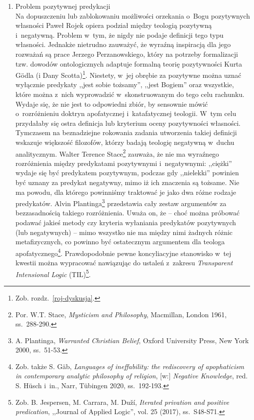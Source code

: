 \begin{enumerate}[label = \arabic*), itemindent=6mm, labelwidth=4mm, labelsep=2mm, itemsep=1em, leftmargin=0mm]
\item Problem pozytywnej predykacji\\
Na dopuszczeniu lub zablokowaniu możliwości orzekania o~Bogu pozytywnych własności Paweł Rojek opiera podział między teologią pozytywną i~negatywną. Problem w~tym, że nigdy nie podaje definicji tego typu własności. Jednakże nietrudno zauważyć, że wyraźną inspiracją dla jego rozważań są prace Jerzego Perzanowskiego, który na potrzeby formalizacji tzw. dowodów ontologicznych adaptuje formalną teorię pozytywności Kurta Gödla (i Dany Scotta)\footnote{Zob. rozdz.~\ref{roj-dyskusja}.}. Niestety, w~jej obrębie za pozytywne można uznać wyłącznie predykaty ,,jest sobie tożsamy'', ,,jest Bogiem'' oraz wszystkie, które można z~nich wyprowadzić w~skonstruowanym do tego celu rachunku. Wydaje się, że nie jest to odpowiedni zbiór, by sensownie mówić o~rozróżnieniu doktryn apofatycznej i~katafatycznej teologii. W~tym celu przydałaby się ostra definicja lub kryterium oceny pozytywności własności. Tymczasem na beznadziejne rokowania zadania utworzenia takiej definicji wskazuje większość filozofów, którzy badają teologię negatywną w~duchu analitycznym. Walter Terence Stace\footnote{Por. W.T. Stace, \textit{Mysticism and Philosophy}, Macmillan, London 1961, ss.~288-290.} zauważa, że nie ma wyraźnego rozróżnienia między predykatami pozytywnymi i~negatywnymi: ,,ciężki'' wydaje się być predykatem pozytywnym, podczas gdy ,,nielekki'' powinien być uznany za predykat negatywny, mimo iż ich znaczenia są tożsame. Nie ma powodu, dla którego powinniśmy traktować je jako dwa różne rodzaje predykatów. Alvin Plantinga\footnote{A. Plantinga, \textit{Warranted Christian Belief}, Oxford University Press, New York 2000, ss.~51-53.} przedstawia cały zestaw argumentów za bezzasadnością takiego rozróżnienia. Uważa on, że -- choć można próbować podawać jakieś metody czy kryteria wyłaniania predykatów pozytywnych (lub negatywnych) -- mimo wszystko nie ma między nimi żadnych różnic metafizycznych, co powinno być ostatecznym argumentem dla teologa apofatycznego\footnote{Zob. także S. Gäb, \textit{Languages of ineffability: the rediscovery of apophaticism in contemporary analytic philosophy of religion}, [w:] \textit{Negative Knowledge}, red. S. Hüsch i~in., Narr, Tübingen 2020, ss.~192-193.}. Prawdopodobnie pewne koncyliacyjne stanowisko w~tej kwestii można wypracować nawiązując do ustaleń z~zakresu \textit{Transparent Intensional Logic} (TIL)\footnote{Zob. B. Jespersen, M. Carrara, M. Duží, \textit{Iterated privation and positive predication}, ,,Journal of Applied Logic'', vol. 25 (2017), ss.~S48-S71.}.


\end{enumerate}
